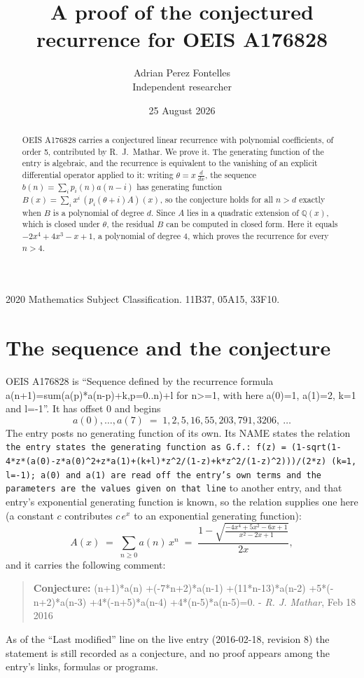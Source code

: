 \documentclass[11pt,a4paper]{article}
\title{A proof of the conjectured recurrence for OEIS A176828}
\author{Adrian Perez Fontelles\\ \small Independent researcher}
\date{25 August 2026}
\theoremstyle{plain}
\theoremstyle{definition}
\begin{document}
\maketitle

\begin{abstract}
OEIS A176828 carries a conjectured linear recurrence with polynomial coefficients, of
order 5, contributed by R.~J.~Mathar. We prove it. The generating function of the
entry is algebraic, and the recurrence is equivalent to the vanishing of an explicit
differential operator applied to it: writing $\theta=x\,\frac{d}{dx}$, the sequence
$b(n)=\sum_{i}p_{i}(n)a(n-i)$ has generating function
$B(x)=\sum_{i}x^{i}\,(p_{i}(\theta+i)A)(x)$, so the conjecture holds for all $n>d$ exactly
when $B$ is a polynomial of degree $d$. Since $A$ lies in a quadratic extension of
$\mathbb{Q}(x)$, which is closed under $\theta$, the residual $B$ can be computed in
closed form. Here it equals $- 2 x^{4} + 4 x^{3} - x + 1$, a polynomial of degree $4$, which proves
the recurrence for every $n>4$.
\end{abstract}

\noindent\small 2020 Mathematics Subject Classification. 11B37, 05A15, 33F10.\normalsize

\section{The sequence and the conjecture}

OEIS A176828 is ``Sequence defined by the recurrence formula a(n+1)=sum(a(p)*a(n-p)+k,p=0..n)+l for n>=1, with here a(0)=1, a(1)=2, k=1 and l=-1''. It has offset $0$ and begins
\[
a(0),\dots,a(7)\;=\;1, 2, 5, 16, 55, 203, 791, 3206,\ \dots
\]
The entry posts no generating function of its own. Its NAME states the
relation \texttt{the entry states the generating function as G.f.: f(z) = (1-sqrt(1-4*z*(a(0)-z*a(0)\textasciicircum{}2+z*a(1)+(k+l)*z\textasciicircum{}2/(1-z)+k*z\textasciicircum{}2/(1-z)\textasciicircum{}2)))/(2*z) (k=1, l=-1); a(0) and a(1) are read off the entry's own terms and the parameters are the values given on that line} to another entry, and that entry's exponential generating
function is known, so the relation supplies one here (a constant $c$ contributes
$c\,e^{x}$ to an exponential generating function):
\begin{equation}\label{eq:gf}
A(x)\;=\;\sum_{n\ge 0} a(n)\,x^{n}\;=\;\frac{1 - \sqrt{\frac{- 4 x^{4} + 5 x^{2} - 6 x + 1}{x^{2} - 2 x + 1}}}{2 x} ,
\end{equation}
and it carries the following comment:
\begin{quote}\small
\textbf{Conjecture:} (n+1)*a(n) +(-7*n+2)*a(n-1) +(11*n-13)*a(n-2) +5*(-n+2)*a(n-3) +4*(-n+5)*a(n-4) +4*(n-5)*a(n-5)=0. - \emph{R. J. Mathar}, Feb 18 2016
\end{quote}
As of the ``Last modified'' line on the live entry (2016-02-18, revision 8) the
statement is still recorded as a conjecture, and no proof appears among the entry's links,
formulas or programs.
\end{document}
